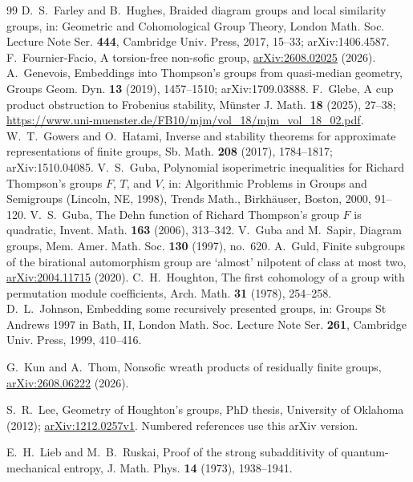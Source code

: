 \documentclass[11pt,a4paper]{article}
\theoremstyle{plain}
\theoremstyle{definition}
\theoremstyle{remark}
\begin{document}
\begin{thebibliography}{99}
 D.~S.~Farley and B.~Hughes, Braided diagram groups and local similarity groups, in: Geometric and Cohomological Group Theory, London Math. Soc. Lecture Note Ser. \textbf{444}, Cambridge Univ. Press, 2017, 15--33; arXiv:1406.4587.
 F.~Fournier-Facio, A torsion-free non-sofic group, \href{https://arxiv.org/abs/2608.02025}{arXiv:2608.02025} (2026).
 A.~Genevois, Embeddings into Thompson's groups from quasi-median geometry, Groups Geom. Dyn. \textbf{13} (2019), 1457--1510; arXiv:1709.03888.
 F.~Glebe, A cup product obstruction to Frobenius stability, M\"unster J. Math. \textbf{18} (2025), 27--38; \url{https://www.uni-muenster.de/FB10/mjm/vol_18/mjm_vol_18_02.pdf}.
 W.~T.~Gowers and O.~Hatami, Inverse and stability theorems for approximate representations of finite groups, Sb. Math. \textbf{208} (2017), 1784--1817; arXiv:1510.04085.
 V.~S.~Guba, Polynomial isoperimetric inequalities for Richard Thompson's groups $F$, $T$, and $V$, in: Algorithmic Problems in Groups and Semigroups (Lincoln, NE, 1998), Trends Math., Birkh\"auser, Boston, 2000, 91--120.
 V.~S.~Guba, The Dehn function of Richard Thompson's group $F$ is quadratic, Invent. Math. \textbf{163} (2006), 313--342.
 V.~Guba and M.~Sapir, Diagram groups, Mem. Amer. Math. Soc. \textbf{130} (1997), no.~620.
 A.~Guld, Finite subgroups of the birational automorphism group are `almost' nilpotent of class at most two, \href{https://arxiv.org/abs/2004.11715}{arXiv:2004.11715} (2020).
 C.~H.~Houghton, The first cohomology of a group with permutation module coefficients, Arch. Math. \textbf{31} (1978), 254--258.
 D.~L.~Johnson, Embedding some recursively presented groups, in: Groups St Andrews 1997 in Bath, II, London Math. Soc. Lecture Note Ser. \textbf{261}, Cambridge Univ. Press, 1999, 410--416.
 {\raggedright G.~Kun and A.~Thom, Nonsofic wreath products of residually finite groups, \href{https://arxiv.org/abs/2608.06222}{arXiv:2608.06222} (2026).\par}
 {\raggedright S.~R.~Lee, Geometry of Houghton's groups, PhD thesis, University of Oklahoma (2012); \href{https://arxiv.org/abs/1212.0257v1}{arXiv:1212.0257v1}. Numbered references use this arXiv version.\par}
 E.~H.~Lieb and M.~B.~Ruskai, Proof of the strong subadditivity of quantum-mechanical entropy, J. Math. Phys. \textbf{14} (1973), 1938--1941.

\end{thebibliography}
\end{document}
